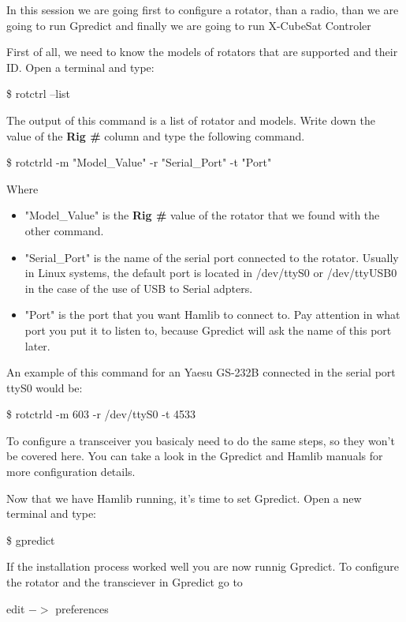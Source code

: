 \documentclass[pdftex,11pt,a4paper,titlepage]{report}
\begin{document}
In this session we are going first to configure a rotator, than a radio, than we are going to run Gpredict and finally we are going to run X-CubeSat Controler

First of all, we need to know the models of rotators that are supported and their ID. Open a terminal and type:
\begin{framed}
\$ rotctrl --list
\end{framed}

The output of this command is a list of rotator and models. Write down the value of the \textbf{Rig \#} column and type the following command.

\begin{framed}
\$ rotctrld -m "Model\_Value" -r "Serial\_Port" -t  "Port"
\end{framed}

Where 
\begin{itemize}
\item "Model\_Value" is the \textbf{Rig \#} value of the rotator that we found with the other command.
\item "Serial\_Port" is the name of the serial port connected to the rotator. Usually in Linux systems, the default port is located in /dev/ttyS0 or /dev/ttyUSB0 in the case of the use of USB to Serial adpters.
\item "Port" is the port that you want Hamlib to connect to. Pay attention in what port you put it to listen to, because Gpredict will ask the name of this port later. 
\end{itemize}

An example of this command for an Yaesu GS-232B connected in the serial port ttyS0 would be:
\begin{framed}
\$ rotctrld -m 603 -r /dev/ttyS0 -t 4533
\end{framed}

To configure a transceiver you basicaly need to do the same steps, so they won't be covered here. You can take a look in the Gpredict and Hamlib manuals for more configuration details.

Now that we have Hamlib running, it's time to set Gpredict. Open a new terminal and type:
\begin{framed}
\$ gpredict
\end{framed}
If the installation process worked well you are now runnig Gpredict. To configure the rotator and the transciever in Gpredict go to
\begin{framed}
edit $->$ preferences
\end{framed}
\end{document}
